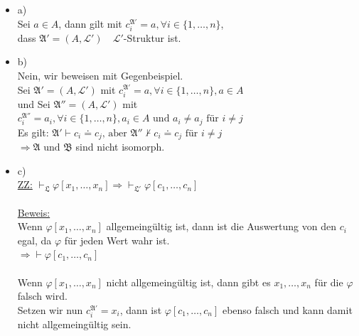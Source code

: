 \documentclass[a4paper]{scrartcl}
\begin{document}
    \begin{itemize}
        \item a)\\
            Sei $a \in A$, dann gilt mit $c_i^{\mathfrak{A'}} = a, \forall i \in \{1,\dots,n\}$,\\
            dass $\mathfrak{A'} = (A, \mathscr{L}') \quad \mathscr{L}'$-Struktur ist.\\ 

        \item b)\\
            Nein, wir beweisen mit Gegenbeispiel.\\
            Sei $\mathfrak{A}' = (A, \mathscr{L}')$ mit $c_i^{\mathfrak{A}'} = a, \forall i \in \{1,\dots,n\}, a \in A$\\
            und Sei $\mathfrak{A}'' = (A, \mathscr{L}')$ mit $c_i^{\mathfrak{A}''} = a_i, \forall i \in \{1,\dots,n\}, a_i \in A \text{ und } a_i \neq a_j
            \text{ für  } i \neq j$\\
            Es gilt: $\mathfrak{A}' \vdash c_i \doteq c_j \text{, aber } \mathfrak{A}'' \nvdash c_i \doteq c_j \text{ für } i \neq j$\\
            $\Rightarrow \mathfrak{A} \text{ und } \mathfrak{B}$ sind nicht isomorph.

        \item c)\\
            \underline{ZZ:} $\vdash_\mathfrak{L} \varphi[x_1,\dots,x_n] \Rightarrow \vdash_\mathfrak{L'} \varphi[c_1,\dots,c_n]$\\
            \\\underline{Beweis:}\\
                Wenn $\varphi[x_1,\dots,x_n]$ allgemeingültig ist, dann ist die Auswertung von den $c_i$ egal, da $\varphi$ für jeden Wert wahr ist.\\
                $\Rightarrow \vdash \varphi[c_1,\dots,c_n]$\\
                \\Wenn $\varphi[x_1,\dots,x_n]$ nicht allgemeingültig ist, dann gibt es $x_1,\dots,x_n$ für die $\varphi$ falsch wird.\\
                Setzen wir nun $c_i^{\mathfrak{A}'} = x_i$, dann ist $\varphi[c_1,\dots,c_n]$ ebenso falsch und kann damit nicht allgemeingültig sein.\\
                

    \end{itemize}
\end{document}
